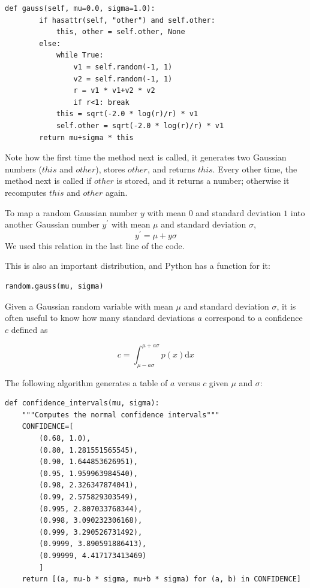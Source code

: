 \documentclass[justified, sixbynine]{tufte-book}
\def\ft{\small\tt}
\theoremstyle{plain}%
\newtheorem * {corollary}{Corollary}
\theoremstyle{definition}
\theoremstyle{remark}
\newtheorem * {remark}{Remark}
\newtheorem * {note}{Note}
\begin{document}
\begin{fullwidth}
\begin{lstlisting}[caption={in file: {\ft nlib.py}}]
    def gauss(self, mu=0.0, sigma=1.0):
        if hasattr(self, "other") and self.other:
            this, other = self.other, None
        else:
            while True:
                v1 = self.random(-1, 1)
                v2 = self.random(-1, 1)
                r = v1 * v1+v2 * v2
                if r<1: break
            this = sqrt(-2.0 * log(r)/r) * v1
            self.other = sqrt(-2.0 * log(r)/r) * v1
        return mu+sigma * this
\end{lstlisting}

Note how the first time the method next is called, it generates two Gaussian
numbers ($this$ and $other$), stores $other$, and returns $this$. Every other
time, the method next is called if $other$ is stored, and it returns a number;
otherwise it recomputes $this$ and $other$ again.

To map a random Gaussian number $y$ with mean $0$ and standard deviation $1$
into another Gaussian number $y^{\prime }$ with mean $\mu $ and standard
deviation $\sigma $, 
\begin{equation}
y^{\prime }=\mu +y\sigma
\end{equation}
We used this relation in the last line of the code.

This is also an important distribution, and Python has a function for it:

\begin{lstlisting}
random.gauss(mu, sigma)
\end{lstlisting}

Given a Gaussian random variable with mean $\mu$ and standard deviation $\sigma$, it is often useful to know how many standard deviations $a$ correspond to a confidence $c$ defined as

\begin{equation}
c = \int_{\mu-a\sigma}^{\mu+a\sigma} p(x)\textrm{d}x
\end{equation}

The following algorithm generates a table of $a$ versus $c$ given $\mu$ and $\sigma$:


\begin{lstlisting}[caption={in file: {\ft nlib.py}}]
def confidence_intervals(mu, sigma):
    """Computes the normal confidence intervals"""
    CONFIDENCE=[
        (0.68, 1.0), 
        (0.80, 1.281551565545), 
        (0.90, 1.644853626951), 
        (0.95, 1.959963984540), 
        (0.98, 2.326347874041), 
        (0.99, 2.575829303549), 
        (0.995, 2.807033768344), 
        (0.998, 3.090232306168), 
        (0.999, 3.290526731492), 
        (0.9999, 3.890591886413), 
        (0.99999, 4.417173413469)
        ]
    return [(a, mu-b * sigma, mu+b * sigma) for (a, b) in CONFIDENCE]
\end{lstlisting}



\end{fullwidth}
\end{document}
